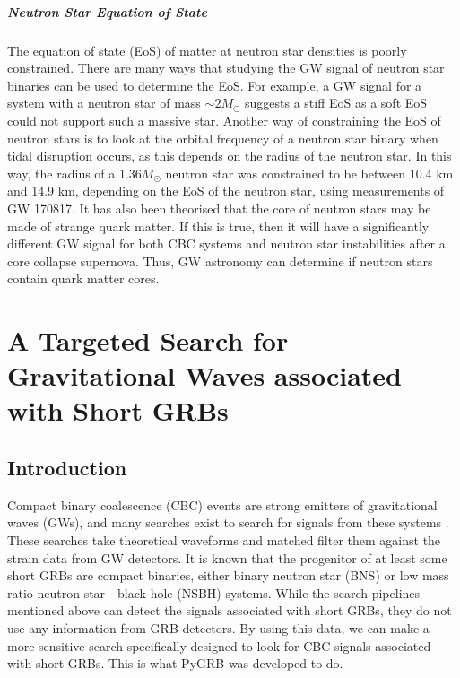 \documentclass[11pt]{cuthesis}
\begin{document}
\paragraph{Neutron Star Equation of State}
The equation of state (EoS) of matter at neutron star densities is poorly constrained. There are many ways that studying the GW signal of neutron star binaries can be used to determine the EoS. For example, a GW signal for a system with a neutron star of mass $\sim 2M_\odot$ suggests a stiff EoS as a soft EoS could not support such a massive star. \cite{Nice:2005fi} Another way of constraining the EoS of neutron stars is to look at the orbital frequency of a neutron star binary when tidal disruption occurs, as this depends on the radius of the neutron star. In this way, the radius of a 1.36$M_\odot$ neutron star was constrained to be between 10.4 km and 14.9 km, depending on the EoS of the neutron star, using measurements of GW 170817. \cite{170817_pe} It has also been theorised that the core of neutron stars may be made of strange quark matter. If this is true, then it will have a significantly different GW signal for both CBC systems \cite{Lattimer:2006xb} and neutron star instabilities after a core collapse supernova. Thus, GW astronomy can determine if neutron stars contain quark matter cores. 


\chapter{A Targeted Search for Gravitational Waves associated with Short GRBs} \label{chap: CBC}
\section{Introduction}\label{CBCintro}
Compact binary coalescence (CBC) events are strong emitters of gravitational waves (GWs), and many searches exist to search for signals from these systems \cite{pycbc_Usman:2015} \cite{gstlal_Sachdev:2019} \cite{gstlal_messick}. These searches take theoretical waveforms \cite{phenom_Khan:2015} and matched filter them against the strain data from GW detectors. It is known that the progenitor of at least some short GRBs are compact binaries, either binary neutron star (BNS) or low mass ratio neutron star - black hole (NSBH) systems. While the search pipelines mentioned above can detect the signals associated with short GRBs, they do not use any information from GRB detectors. By using this data, we can make a more sensitive search specifically designed to look for CBC signals associated with short GRBs. This is what PyGRB was developed to do.
\end{document}
